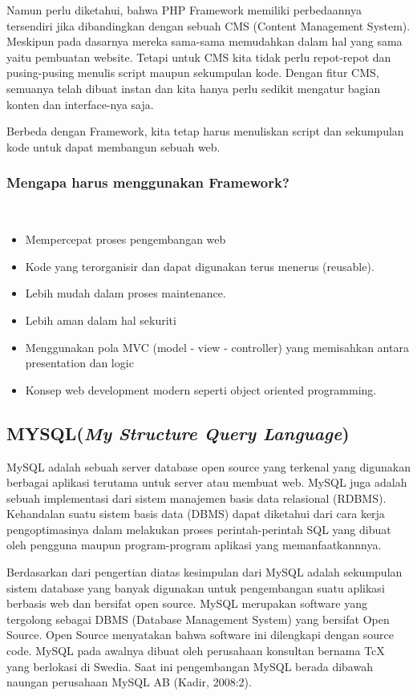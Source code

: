 Namun perlu diketahui, bahwa PHP Framework memiliki perbedaannya tersendiri jika dibandingkan dengan sebuah CMS (Content Management System). Meskipun pada dasarnya mereka sama-sama memudahkan dalam hal yang sama yaitu pembuatan website. Tetapi untuk CMS  kita tidak perlu repot-repot dan pusing-pusing menulis script maupun sekumpulan kode. Dengan fitur CMS, semuanya telah dibuat instan dan kita hanya perlu sedikit mengatur bagian konten dan interface-nya saja.

Berbeda dengan Framework, kita tetap harus menuliskan script dan sekumpulan kode untuk dapat membangun sebuah web. 

\subsubsection{Mengapa harus menggunakan Framework?}
\hfill\\
\begin{itemize}
	\item Mempercepat proses pengembangan web
	\item Kode yang terorganisir dan dapat digunakan terus menerus (reusable).
	\item Lebih mudah dalam proses maintenance.
	\item Lebih aman dalam hal sekuriti
	\item Menggunakan pola MVC (model - view - controller) yang memisahkan antara presentation dan logic
	\item Konsep web development modern seperti object oriented programming.

\end{itemize}


\subsection{MYSQL(\textit{My Structure Query Language})}
MySQL adalah sebuah server database open source yang terkenal yang digunakan berbagai aplikasi terutama untuk server atau membuat web. MySQL juga adalah sebuah implementasi dari sistem manajemen basis data relasional (RDBMS). Kehandalan suatu sistem basis data (DBMS) dapat diketahui dari cara kerja pengoptimasinya dalam melakukan proses perintah-perintah SQL yang dibuat oleh pengguna maupun program-program aplikasi yang memanfaatkannnya.

Berdasarkan dari pengertian diatas kesimpulan dari MySQL adalah sekumpulan sistem database yang banyak digunakan untuk pengembangan suatu aplikasi berbasis web dan bersifat open source.
MySQL merupakan software yang tergolong sebagai DBMS (Database Management System) yang bersifat Open Source. Open Source menyatakan bahwa software ini dilengkapi dengan source code. MySQL pada awalnya dibuat oleh perusahaan konsultan bernama TcX yang berlokasi di Swedia. Saat ini pengembangan MySQL berada dibawah naungan perusahaan MySQL AB (Kadir, 2008:2).

